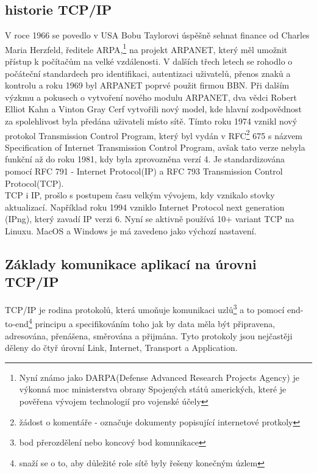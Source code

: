 \documentclass[12pt]{article}
\begin{document}
\subsection{historie TCP/IP}
V roce 1966 se povedlo v USA Bobu Taylorovi úspěšně sehnat finance od Charles Maria Herzfeld, ředitele ARPA,\footnote{Nyní známo jako DARPA(Defense Advanced Research Projects Agency) je výkonná moc ministerstva obrany Spojených států amerických, které je pověřena vývojem technologií pro vojenské účely} na projekt ARPANET, který měl umožnit přístup k počítačům na velké vzdálenosti. V dalších třech letech se rohodlo o počáteční standardech pro identifikaci, autentizaci uživatelů, přenos znaků a kontrolu a roku 1969 byl ARPANET poprvé použit firmou BBN. 
Při dalším výzkmu a pokusech o vytvoření nového modulu ARPANET, dva vědci Robert Elliot Kahn a Vinton Gray Cerf vytvořili nový model, kde hlavní zodpovědnost za spolehlivost byla předána uživateli místo sítě. Tímto roku 1974 vznikl nový protokol Transmission Control Program, který byl vydán v RFC\footnote{žádost o komentáře - označuje dokumenty popisující internetové protkoly} 675 s názvem Specification of Internet Transmission Control Program, avšak tato verze nebyla funkční až do roku 1981, kdy byla zprovozněna verzí 4. Je standardizována pomocí RFC 791 - Internet Protocol(IP) a RFC 793 Transmission Control Protocol(TCP). 
\\
TCP i IP, prošlo s postupem času velkým vývojem, kdy vznikalo stovky aktualizací. Například roku 1994 vzniklo Internet Protocol next generation (IPng), který zavadí IP verzi 6. Nyní se aktivně používá 10+ variant TCP na Linuxu. MacOS a Windows je má zavedeno jako výchozí nastavení. 

\subsection{Základy komunikace aplikací na úrovni TCP/IP}
TCP/IP je rodina protokolů, která umoňuje komunikaci uzlů\footnote{bod přerozdělení nebo koncový bod komunikace} a to pomocí end-to-end\footnote{snaží se o to, aby důležité role sítě byly řešeny konečným úzlem} principu a specifikováním toho jak by data měla být připravena, adresována, přenášena, směrována a přijmána. Tyto protokoly jsou nejčastěji děleny do čtyř úrovní Link, Internet, Transport a Application. 
\end{document}
